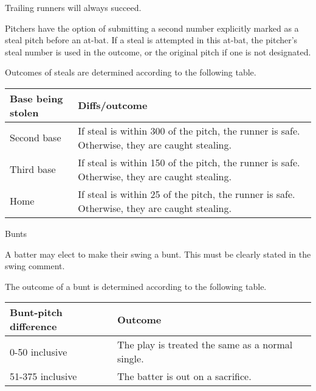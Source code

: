 \begin{deepEnumerate}
\begin{deepEnumerate}
\begin{deepEnumerate}
\begin{deepEnumerate}
				Trailing runners will always succeed.
			\end{deepEnumerate}
			\item Pitchers have the option of submitting a second number explicitly marked as a steal pitch before an at-bat. 
			If a steal is attempted in this at-bat, the pitcher’s steal number is used in the outcome, 
			or the original pitch if one is not designated.
		\end{deepEnumerate}
		\pagebreak %
		\item Outcomes of steals are determined according to the following table.
		\begin{center}
			\begin{tabular}{|p{3cm}|p{8cm}|}
				\hline
				\textbf{Base being stolen} & \textbf{Diffs/outcome}                                                                        \\
				\hline 
				Second base                & If steal is within 300 of the pitch, the runner is safe. Otherwise, they are caught stealing. \\
				\hline
				Third base                 & If steal is within 150 of the pitch, the runner is safe. Otherwise, they are caught stealing. \\
				\hline
				Home                       & If steal is within 25 of the pitch, the runner is safe. Otherwise, they are caught stealing.  \\
				\hline
			\end{tabular}
		\end{center}
	\end{deepEnumerate}
	\item Bunts
	\begin{deepEnumerate}
		\item A batter may elect to make their swing a bunt. This must be clearly stated in the swing comment.
		\item The outcome of a bunt is determined according to the following table.        
		\begin{center}
			\begin{tabular}{|p{3cm}|p{8cm}|}
				\hline
				\textbf{Bunt-pitch difference} & \textbf{Outcome}                                 \\
				\hline 
				0-50 inclusive                 & The play is treated the same as a normal single. \\
				\hline 
				51-375 inclusive               & The batter is out on a sacrifice.                

\end{tabular}
\end{center}
\end{deepEnumerate}
\end{deepEnumerate}
